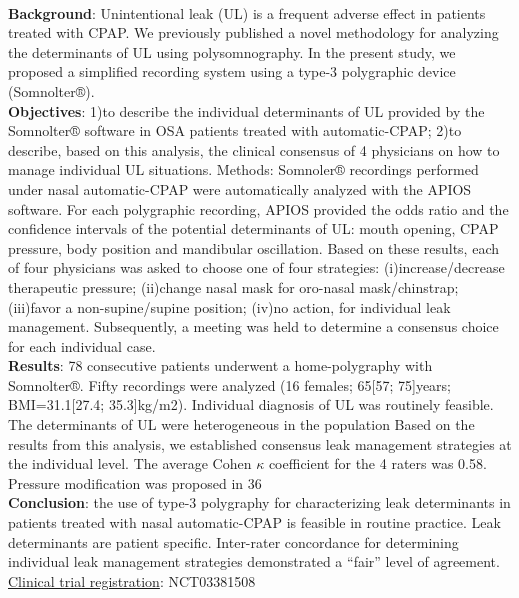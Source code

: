 \\
\textbf{Background}: Unintentional leak (UL) is a frequent adverse effect in patients treated with CPAP. We previously published a novel methodology for analyzing the determinants of UL using polysomnography. In the present study, we proposed a simplified recording system using a type-3 polygraphic device (Somnolter®).
\\
\textbf{Objectives}: 1)to describe the individual determinants of UL provided by the Somnolter® software in OSA patients treated with automatic-CPAP; 2)to describe, based on this analysis, the clinical consensus of 4 physicians on how to manage individual UL situations.
Methods: Somnoler® recordings performed under nasal automatic-CPAP were automatically analyzed with the APIOS software. For each polygraphic recording, APIOS provided the odds ratio and the confidence intervals of the potential determinants of UL: mouth opening, CPAP pressure, body position and mandibular oscillation. Based on these results, each of four physicians was asked to choose one of four strategies: (i)increase/decrease therapeutic pressure; (ii)change nasal mask for oro-nasal mask/chinstrap; (iii)favor a non-supine/supine position; (iv)no action, for individual leak management. Subsequently, a meeting was held to determine a consensus choice for each individual case.
\\
\textbf{Results}: 78 consecutive patients underwent a home-polygraphy with Somnolter®. Fifty recordings were analyzed (16 females; 65[57; 75]years; BMI=31.1[27.4; 35.3]kg/m2). Individual diagnosis of UL was routinely feasible. The determinants of UL were heterogeneous in the population Based on the results from this analysis, we established consensus leak management strategies at the individual level. The average Cohen $\kappa$ coefficient for the 4 raters was 0.58. Pressure modification was proposed in 36%
\\
\textbf{Conclusion}: the use of type-3 polygraphy for characterizing leak determinants in patients treated with nasal automatic-CPAP is feasible in routine practice. Leak determinants are patient specific. Inter-rater concordance for determining individual leak management strategies demonstrated a “fair” level of agreement.
\bigbreak
\underline{Clinical trial registration}: NCT03381508